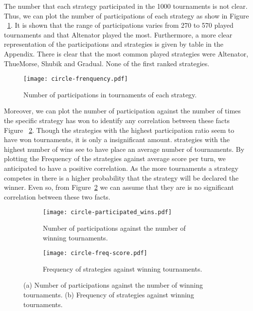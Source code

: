The number that each strategy participated in the 1000 tournaments
is not clear. Thus, we can plot the number of participations of each strategy
as show in Figure ~\ref{fig:circle_freq}. It is shown that the range of participations varies
from 270 to 570 played tournaments and that Altenator played the most.
Furthermore, a more clear representation of the participations and strategies is
given by table in the Appendix. There is clear that the most common played
strategies were Altenator, ThueMorse, Shubik and Gradual. None of the first ranked
strategies.

\begin{figure}[h!]
\centering
    \texttt{[image: circle-frenquency.pdf]}
    \caption{Number of participations in tournaments of each strategy.}
    \label{fig:circle_freq}
\end{figure}

Moreover, we can plot the number of participation against the number of times
the specific strategy has won to identify any correlation between these facts
Figure ~\ref{fig:circle_part-wins}. Though the strategies with the highest participation
ratio seem to have won tournaments, it is only a insignificant amount. strategies
with the highest number of wins see to have place an average number of tournaments.
By plotting the Frequency of the strategies against average score per turn,
we anticipated to have a positive correlation. As the more tournaments a strategy
competes in there is a higher probability that the strategy will be declared
the winner. Even so, from Figure~\ref{fig:circle_part-wins} we can assume that
they are is no significant correlation between these two facts.

\begin{figure}[h!]
\hspace*{-4cm}
    \begin{subfigure}[t]{1.4\textwidth}
    \centering
        \texttt{[image: circle-participated\_wins.pdf]}
    \caption{Number of participations against the number of winning tournaments.}
    \end{subfigure}
\hfill
\hspace*{-4cm}
    \begin{subfigure}[t]{1.4\textwidth}\centering
    \centering
        \texttt{[image: circle-freq-score.pdf]}
    \caption{Frequency of strategies against winning tournaments.}
    \end{subfigure}
\caption{(a) Number of participations against the number of winning tournaments.
         (b) Frequency of strategies against winning tournaments.}
\label{fig:circle_part-wins}
\end{figure}

